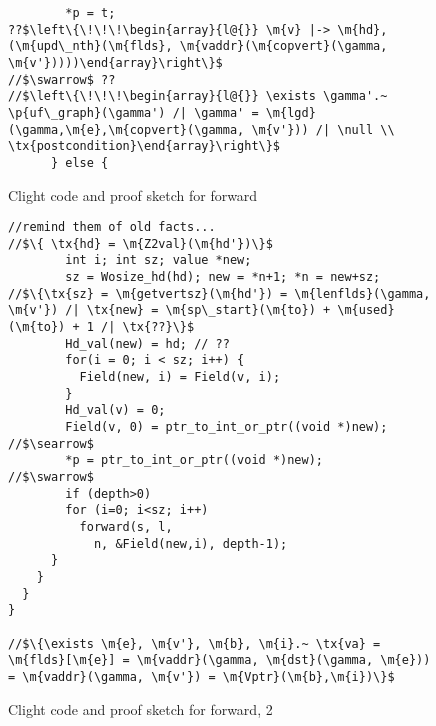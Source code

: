 \begin{figure*}[!ht]
\begin{lstlisting}
        *p = t;
??$\left\{\!\!\!\begin{array}{l@{}} \m{v} |-> \m{hd},(\m{upd\_nth}(\m{flds}, \m{vaddr}(\m{copvert}(\gamma, \m{v'}))))\end{array}\right\}$
//$\swarrow$ ??
//$\left\{\!\!\!\begin{array}{l@{}} \exists \gamma'.~ \p{uf\_graph}(\gamma') /| \gamma' = \m{lgd}(\gamma,\m{e},\m{copvert}(\gamma, \m{v'})) /| \null \\ \tx{postcondition}\end{array}\right\}$
      } else {
\end{lstlisting}
\vspace{-0.4em}
\caption{Clight code and proof sketch for forward}
\label{fig:forward}
\vspace{-1em}
\end{figure*}

\begin{figure*}[!ht]
\vspace{-1ex}
  \begin{lstlisting}
//remind them of old facts...
//$\{ \tx{hd} = \m{Z2val}(\m{hd'})\}$
        int i; int sz; value *new;
        sz = Wosize_hd(hd); new = *n+1; *n = new+sz;
//$\{\tx{sz} = \m{getvertsz}(\m{hd'}) = \m{lenflds}(\gamma, \m{v'}) /| \tx{new} = \m{sp\_start}(\m{to}) + \m{used}(\m{to}) + 1 /| \tx{??}\}$        
        Hd_val(new) = hd; // ??
        for(i = 0; i < sz; i++) {
          Field(new, i) = Field(v, i);
        }
        Hd_val(v) = 0;
        Field(v, 0) = ptr_to_int_or_ptr((void *)new);
//$\searrow$
        *p = ptr_to_int_or_ptr((void *)new);
//$\swarrow$
        if (depth>0)
        for (i=0; i<sz; i++)
          forward(s, l, 
            n, &Field(new,i), depth-1);
      }
    }
  }
}

//$\{\exists \m{e}, \m{v'}, \m{b}, \m{i}.~ \tx{va} = \m{flds}[\m{e}] = \m{vaddr}(\gamma, \m{dst}(\gamma, \m{e})) = \m{vaddr}(\gamma, \m{v'}) = \m{Vptr}(\m{b},\m{i})\}$

\end{lstlisting}
\vspace{-0.4em}
\caption{Clight code and proof sketch for forward, 2}
\label{fig:forward2}
\vspace{-1em}
\end{figure*}


